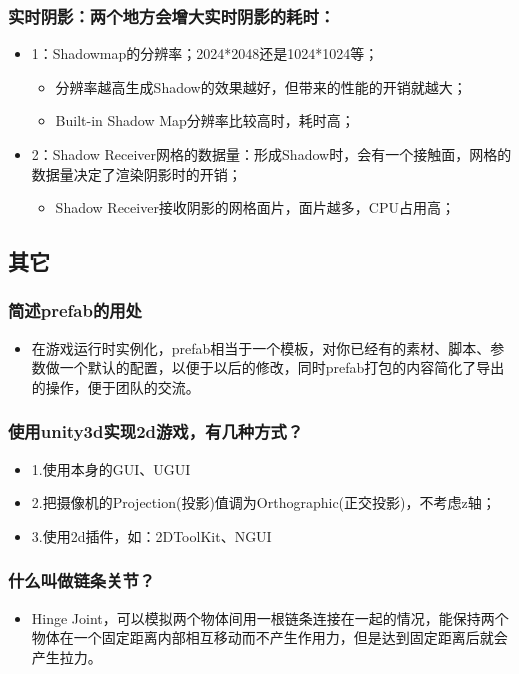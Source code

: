 \documentclass[9pt, b5paper]{article}
\begin{document}
\subsubsection{实时阴影：两个地方会增大实时阴影的耗时：}
\label{sec:orgf161ad3}
\begin{itemize}
\item 1：Shadowmap的分辨率；2024*2048还是1024*1024等；
\begin{itemize}
\item 分辨率越高生成Shadow的效果越好，但带来的性能的开销就越大；
\item Built-in Shadow Map分辨率比较高时，耗时高；
\end{itemize}
\item 2：Shadow Receiver网格的数据量：形成Shadow时，会有一个接触面，网格的数据量决定了渲染阴影时的开销；
\begin{itemize}
\item Shadow Receiver接收阴影的网格面片，面片越多，CPU占用高；
\end{itemize}
\end{itemize}

\subsection{其它}
\label{sec:org0e11ad7}
\subsubsection{简述prefab的用处}
\label{sec:org36336d9}
\begin{itemize}
\item 在游戏运行时实例化，prefab相当于一个模板，对你已经有的素材、脚本、参数做一个默认的配置，以便于以后的修改，同时prefab打包的内容简化了导出的操作，便于团队的交流。
\end{itemize}
\subsubsection{使用unity3d实现2d游戏，有几种方式？}
\label{sec:org94193b1}
\begin{itemize}
\item 1.使用本身的GUI、UGUI
\item 2.把摄像机的Projection(投影)值调为Orthographic(正交投影)，不考虑z轴；
\item 3.使用2d插件，如：2DToolKit、NGUI
\end{itemize}
\subsubsection{什么叫做链条关节？}
\label{sec:orga7c9ffd}
\begin{itemize}
\item Hinge Joint，可以模拟两个物体间用一根链条连接在一起的情况，能保持两个物体在一个固定距离内部相互移动而不产生作用力，但是达到固定距离后就会产生拉力。
\end{itemize}
\end{document}
